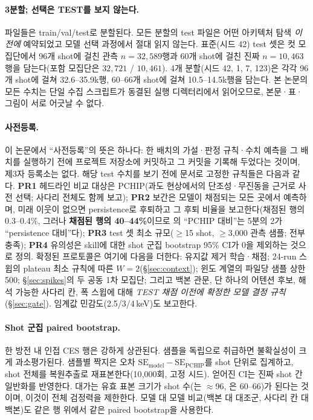 \documentclass[10pt,a4paper]{article}
\begin{document}
\paragraph{3분할; 선택은 TEST를 보지 않는다.}
파일들은 train/val/test로 분할된다. 모든 분할의 test 파일은 어떤 아키텍처 탐색
\emph{이전에} 예약되었고 모델 선택 과정에서 절대 읽지 않는다. 표준(시드 42)
test 셋은 컷 모집단에서 96개 shot에 걸친 관측 \Ti{} $n = 32{,}589$행과 60개
shot에 걸친 진짜 \Vrot{} $n = 10{,}463$행을 담는다(포함 모집단은
$32{,}721$ / $10{,}461$). 4개 분할(시드 42, 1, 7, 123)은 각각 96개 shot에 걸쳐
\Ti{} 32.6--35.9k행, 60--66개 shot에 걸쳐 \Vrot{} 10.5--14.5k행을 담는다. 본
논문의 모든 수치는 단일 수집 스크립트가 동결된 실행 디렉터리에서 읽어오므로,
본문·표·그림이 서로 어긋날 수 없다.

\paragraph{사전등록.}
이 논문에서 ``사전등록''의 뜻은 하나다: 한 배치의 가설·판정 규칙·수치 예측을 그 배치를
실행하기 전에 프로젝트 저장소에 커밋하고 그 커밋을 기록해 두었다는 것이며, 제3자
등록소는 없다.
해당 test 수치를 보기 전에 문서로 고정한 규칙들은 다음과 같다.
\textbf{PR1} 헤드라인 비교 대상은 PCHIP(과도 현상에서의 단조성·무진동을 근거로
사전 선택; 사다리 전체도 함께 보고);
\textbf{PR2} 보간은 모델이 채점되는 모든 곳에서 예측하며, 미래 이웃이 없으면
persistence로 후퇴하고 그 후퇴 비율을 보고한다(채점된 \Ti{} 행의 0.3--0.4\%,
그러나 \textbf{채점된 \Vrot{} 행의 40--44\%}이므로 \Vrot{}의 ``PCHIP 대비''는
5분의 2가 ``persistence 대비''다);
\textbf{PR3} test 셋 최소 규모($\geq$15 shot, $\geq$3{,}000 관측 \Ti{} 샘플;
전부 충족);
\textbf{PR4} 유의성은 skill에 대한 shot 군집 bootstrap 95\% CI가 0을 제외하는
것으로 정의. 확정된 프로토콜은 여기에 다음을 더한다: 유지값 제거 학습·채점;
24-run 스윕의 plateau 최소 규칙에 따른 $W{=}2$(\S\ref{sec:context}); 윈도 계열의
파일당 샘플 상한 500; \S\ref{sec:spikes}의 두 공동 1차 모집단; 그리고 백본
관문, 단 하나의 어텐션 후보, 해석 가능한 사다리 칸, 폭 스윕에 대해
\emph{TEST 채점 이전에 확정한 모델 결정 규칙}(\S\ref{sec:gate}). 임계값
민감도(2.5/3/4\,keV)도 보고한다.

\paragraph{Shot 군집 paired bootstrap.}
한 방전 내 인접 CES 행은 강하게 상관된다. 샘플을 독립으로 취급하면 불확실성이
크게 과소평가된다. 샘플별 짝지은 오차
$\mathrm{SE}_{\mathrm{model}}-\mathrm{SE}_{\mathrm{PCHIP}}$를 shot 단위로
집계하고, shot 전체를 복원추출로 재표본한다(10{,}000회, 고정 시드). 얻어진 CI는
진짜 shot 간 일반화를 반영한다. 대가는 유효 표본 크기가 shot 수(\Ti{}는
$\approx$96, \Vrot{}은 60--66)가 된다는 것이며, 이것이 전체 검정력을 제한한다.
모델 대 모델 비교(백본 대 대조군, 사다리 칸 대 백본)도 같은 행 위에서 같은
paired bootstrap을 사용한다.
\end{document}
